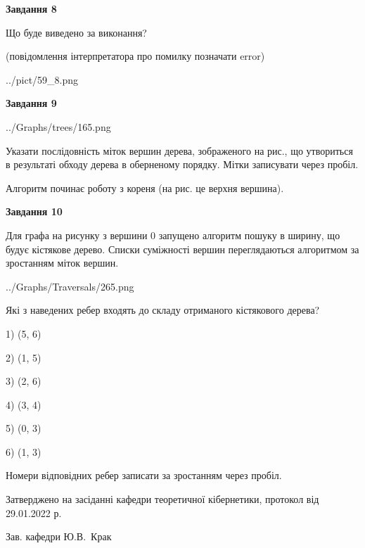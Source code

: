 \documentclass[12pt, ukrainian]{article}
\begin{document}
{\begin {large}
{\begin {center}\textbf{Завдання 8}\end {center}}\par
Що буде виведено за виконання?\par
 (повідомлення інтерпретатора про помилку позначати error)\par
\begin{center}
	{../pict/59_8.png}
\end{center}
\newpage

{\begin {center}\textbf{Завдання 9}\end {center}}\par

\begin{center}
	{../Graphs/trees/165.png}
\end{center}
Указати послідовність міток вершин дерева, зображеного на рис., що утвориться в результаті обходу дерева в оберненому порядку. Мітки записувати через пробіл.\par Алгоритм починає роботу з кореня (на рис. це верхня вершина).\par
\newpage

{\begin {center}\textbf{Завдання 10}\end {center}}\par
Для графа на рисунку з вершини 0 запущено алгоритм пошуку в ширину, що будує кістякове дерево. Списки суміжності вершин переглядаються алгоритмом за зростанням міток вершин.\par
\begin{center}
	{../Graphs/Traversals/265.png}
\end{center}
\par Які з наведених ребер входять до складу отриманого кістякового дерева?\par
1) (5, 6)\par
2) (1, 5)\par
3) (2, 6)\par
4) (3, 4)\par
5) (0, 3)\par
6) (1, 3)\par
{\vskip 15pt} Номери відповідних ребер записати за зростанням через пробіл.\par
\newpage


\end {large}
}
{\smallskip \begin {small} Затверджено на засіданні кафедри теоретичної кібернетики, протокол  від   29.01.2022 р.\par\smallskip\smallskip
{\parbox {6.5 cm}{Зав. кафедри \dotfill Ю.В.~Крак}} \end{small}}
\end{document}
